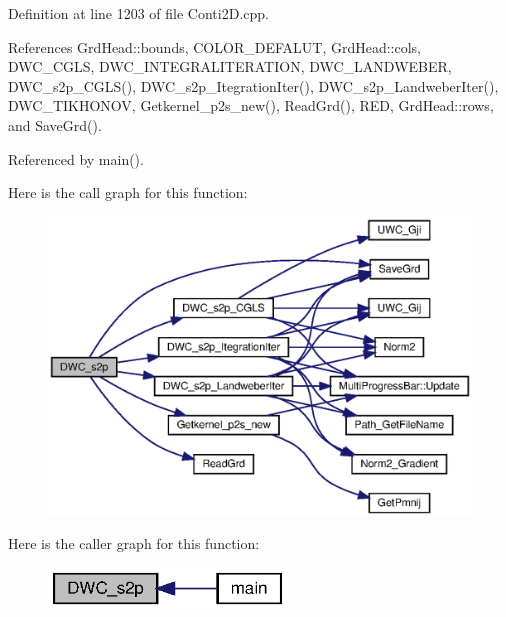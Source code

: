 Definition at line 1203 of file Conti2\+D.\+cpp.



References Grd\+Head\+::bounds, C\+O\+L\+O\+R\+\_\+\+D\+E\+F\+A\+L\+UT, Grd\+Head\+::cols, D\+W\+C\+\_\+\+C\+G\+LS, D\+W\+C\+\_\+\+I\+N\+T\+E\+G\+R\+A\+L\+I\+T\+E\+R\+A\+T\+I\+ON, D\+W\+C\+\_\+\+L\+A\+N\+D\+W\+E\+B\+ER, D\+W\+C\+\_\+s2p\+\_\+\+C\+G\+L\+S(), D\+W\+C\+\_\+s2p\+\_\+\+Itegration\+Iter(), D\+W\+C\+\_\+s2p\+\_\+\+Landweber\+Iter(), D\+W\+C\+\_\+\+T\+I\+K\+H\+O\+N\+OV, Getkernel\+\_\+p2s\+\_\+new(), Read\+Grd(), R\+ED, Grd\+Head\+::rows, and Save\+Grd().



Referenced by main().

Here is the call graph for this function\+:
\nopagebreak
\begin{figure}[H]
\begin{center}
\leavevmode
\includegraphics[width=350pt]{Conti2D_8cpp_ab256354d6264edd8deb4e31f98a7489f_ab256354d6264edd8deb4e31f98a7489f_cgraph}
\end{center}
\end{figure}
Here is the caller graph for this function\+:\nopagebreak
\begin{figure}[H]
\begin{center}
\leavevmode
\includegraphics[width=179pt]{Conti2D_8cpp_ab256354d6264edd8deb4e31f98a7489f_ab256354d6264edd8deb4e31f98a7489f_icgraph}
\end{center}
\end{figure}
\mbox{\label{Conti2D_8cpp_a6516cfeb71abcf844b32f101e5f77a71_a6516cfeb71abcf844b32f101e5f77a71}} 
